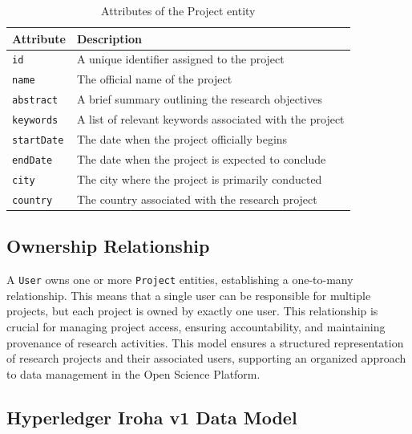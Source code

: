 \documentclass{article}
\begin{document}
\begin{table}[h]
      \centering
      \caption{Attributes of the Project entity}
      \label{tab:project_attributes}
      \begin{tabular}{|l|l|}
            \hline
            \textbf{Attribute} & \textbf{Description}                                    \\ \hline
            \texttt{id}        & A unique identifier assigned to the project             \\ \hline
            \texttt{name}      & The official name of the project                        \\ \hline
            \texttt{abstract}  & A brief summary outlining the research objectives       \\ \hline
            \texttt{keywords}  & A list of relevant keywords associated with the project \\ \hline
            \texttt{startDate} & The date when the project officially begins             \\ \hline
            \texttt{endDate}   & The date when the project is expected to conclude       \\ \hline
            \texttt{city}      & The city where the project is primarily conducted       \\ \hline
            \texttt{country}   & The country associated with the research project        \\ \hline
      \end{tabular}
\end{table}

\subsection{Ownership Relationship}
A \texttt{User} owns one or more \texttt{Project} entities, establishing a one-to-many relationship. This means that a single user can be responsible for multiple projects, but each project is owned by exactly one user. This relationship is crucial for managing project access, ensuring accountability, and maintaining provenance of research activities. This model ensures a structured representation of research projects and their associated users, supporting an organized approach to data management in the Open Science Platform.

\subsection{Hyperledger Iroha v1 Data Model}
\end{document}
